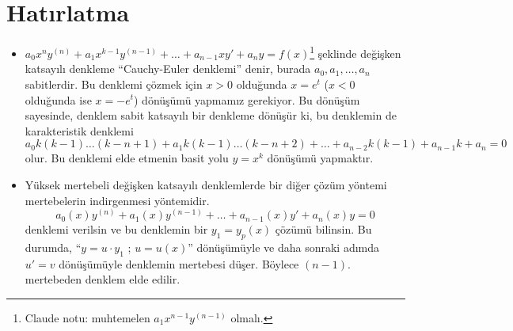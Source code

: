 \documentclass[11pt,a4paper]{article}
\begin{document}
\renewcommand\thempfootnote{\alph{mpfootnote}}%

\hfill{}
\section{Hatırlatma}
\begin{itemize}[label=$\ast$]
\item $a_0x^ny^{(n)} + a_1x^{k-1}y^{(n-1)} + \dots + a_{n-1}xy' + a_ny = f(x)$\footnote{Claude notu: muhtemelen $a_1x^{n-1}y^{(n-1)}$ olmalı.} şeklinde değişken katsayılı denkleme ``Cauchy-Euler denklemi'' denir, burada $a_0, a_1, \dots, a_n$ sabitlerdir. Bu denklemi çözmek için $x>0$ olduğunda $x = e^{t}$ ($x<0$ olduğunda ise $x = -e^{t}$) dönüşümü yapmamız gerekiyor. Bu dönüşüm sayesinde, denklem sabit katsayılı bir denkleme dönüşür ki, bu denklemin de karakteristik denklemi
\[
a_0k(k-1)\dots(k-n+1) + a_1k(k-1)\dots(k-n+2) + \dots + a_{n-2}k(k-1) + a_{n-1}k + a_n = 0
\]
olur. Bu denklemi elde etmenin basit yolu $y = x^{k}$ dönüşümü yapmaktır.
\item Yüksek mertebeli değişken katsayılı denklemlerde bir diğer çözüm yöntemi mertebelerin indirgenmesi yöntemidir.
\[
a_0(x)y^{(n)} + a_1(x)y^{(n-1)} + \dots + a_{n-1}(x)y' + a_n(x)y = 0
\]
denklemi verilsin ve bu denklemin bir $y_1 = y_p(x)$ çözümü bilinsin. Bu durumda, ``$y = u\cdot y_1$ ; $u = u(x)$'' dönüşümüyle ve daha sonraki adımda $u' = v$ dönüşümüyle denklemin mertebesi düşer. Böylece $(n-1)$. mertebeden denklem elde edilir.
\end{itemize}
\end{document}
